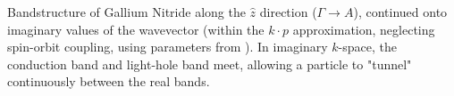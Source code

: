 Bandstructure of Gallium Nitride along the $\hat{z}$ direction ($\Gamma\rightarrow A$), continued onto imaginary values of the wavevector (within the $k\cdot p$ approximation, neglecting spin-orbit coupling, using parameters from \cite{Rinke_2008}).  In imaginary $k$-space, the conduction band and light-hole band meet, allowing a particle to "tunnel" continuously between the real bands.
\label{fig:imagBS}
